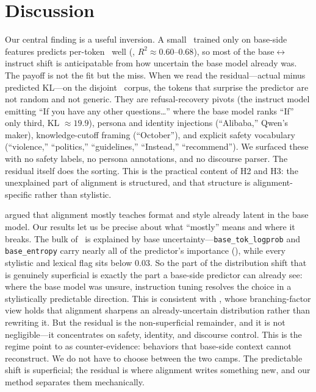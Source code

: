 \section{Discussion}\label{sec:discussion}

 Our central finding is a useful inversion. A small \gbt\ trained only on base-side features predicts per-token \klt\ well (, $R^2 \approx 0.60$--$0.68$), so most of the base$\leftrightarrow$instruct shift is anticipatable from how uncertain the base model already was. The payoff is not the fit but the miss. When we read the residual---actual minus predicted KL---on the disjoint \justeval\ corpus, the tokens that surprise the predictor are not random and not generic. They are refusal-recovery pivots (the instruct model emitting ``If you have any other questions\ldots'' where the base model ranks ``If'' only third, KL $\approx 19.9$), persona and identity injections (``Alibaba,'' Qwen's maker), knowledge-cutoff framing (``October''), and explicit safety vocabulary (``violence,'' ``politics,'' ``guidelines,'' ``Instead,'' ``recommend''). We surfaced these with no safety labels, no persona annotations, and no discourse parser. The residual itself does the sorting. This is the practical content of H2 and H3: the unexplained part of alignment is structured, and that structure is alignment-specific rather than stylistic.

 \citet{zhou2023lima} argued that alignment mostly teaches format and style already latent in the base model. Our results let us be precise about what ``mostly'' means and where it breaks. The bulk of \klt\ is explained by base uncertainty---\texttt{base\_tok\_logprob} and \texttt{base\_entropy} carry nearly all of the predictor's importance (), while every stylistic and lexical flag sits below $0.03$. So the part of the distribution shift that is genuinely superficial is exactly the part a base-side predictor can already see: where the base model was unsure, instruction tuning resolves the choice in a stylistically predictable direction. This is consistent with \citet{yang2026branching}, whose branching-factor view holds that alignment sharpens an already-uncertain distribution rather than rewriting it. But the residual is the non-superficial remainder, and it is not negligible---it concentrates on safety, identity, and discourse control. This is the regime \citet{revisiting2024superficial} point to as counter-evidence: behaviors that base-side context cannot reconstruct. We do not have to choose between the two camps. The predictable shift is superficial; the residual is where alignment writes something new, and our method separates them mechanically.

